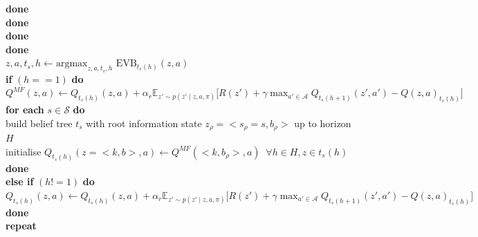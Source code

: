 \documentclass{article}
\begin{document}
\hspace*{0.5cm} \hspace*{0.5cm} \hspace*{0.5cm} \hspace*{0.5cm} \textbf{done} \\
\hspace*{0.5cm} \hspace*{0.5cm} \hspace*{0.5cm} \textbf{done}\\
\hspace*{0.5cm} \hspace*{0.5cm} \textbf{done}\\
\hspace*{0.5cm} \textbf{done}\\
\hspace*{0.5cm} $z, a, t_s, h \leftarrow \text{argmax}_{z, a, t_{s}, h} \, \, \text{EVB}_{t_{s}(h)}(z, a)$\\
\hspace*{0.5cm} \textbf{if} $(h == 1)$ \textbf{do}\\
\hspace*{0.5cm} \hspace*{0.5cm} $Q^{MF}(z, a) \leftarrow Q_{t_{s}(h)}(z, a) + \alpha_r \mathbb{E}_{z'\sim p(z'\mid z, a, \pi)}\big[R(z') + \gamma \max_{a' \in \mathcal{A}}Q_{t_{s}(h+1)}(z', a') - Q(z, a)_{t_s(h)}\big]$\\
\hspace*{0.5cm} \hspace*{0.5cm} \textbf{for each} $s \in \mathcal{S}$ \textbf{do} \\
\hspace*{0.5cm} \hspace*{0.5cm} \hspace*{0.5cm} build belief tree $t_s$ with root information state $z_{\rho}=<s_{\rho}=s, b_{\rho}>$ up to horizon $H$\\
\hspace*{0.5cm} \hspace*{0.5cm} \hspace*{0.5cm} initialise $Q_{t_{s}(h)}(z=<k, b>, a) \leftarrow Q^{MF}(<k, b_{\rho}>, a) \; \; \forall h \in H, z \in t_{s}(h)$\\
\hspace*{0.5cm} \hspace*{0.5cm} \textbf{done}\\
\hspace*{0.5cm} \textbf{else if} $(h != 1)$ \textbf{do}\\
\hspace*{0.5cm} \hspace*{0.5cm} $Q_{t_{s}(h)}(z, a) \leftarrow Q_{t_{s}(h)}(z, a) + \alpha_r \mathbb{E}_{z'\sim p(z'\mid z, a, \pi)}\big[R(z') + \gamma \max_{a' \in \mathcal{A}}Q_{t_{s}(h+1)}(z', a') - Q(z, a)_{t_s(h)}\big]$\\
\hspace*{0.5cm} \textbf{done}\\
\textbf{repeat}
\end{document}
